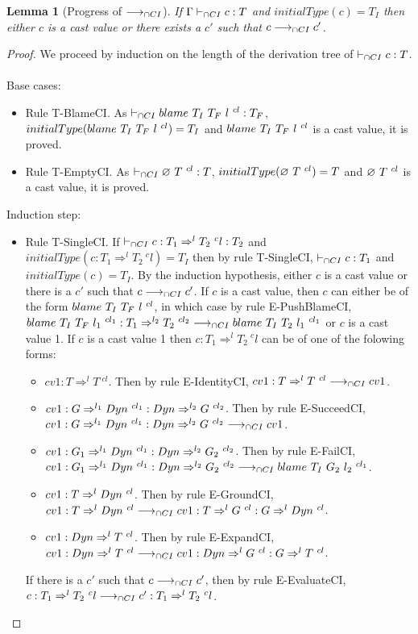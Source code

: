 \documentclass[a4paper]{article}
\newtheorem{lemma}{Lemma}[section]
\begin{document}
\begin{lemma}[Progress of $\longrightarrow_{\cap CI}$]
\label{progressCI}
If $\Gamma \vdash_{\cap CI} c : T$ and $initialType(c) = T_I$ then either $c$ is a cast value or there exists a $c'$ such that $c \longrightarrow_{\cap CI} c'$.
\end{lemma}
\begin{proof}
We proceed by induction on the length of the derivation tree of $\vdash_{\cap CI} c : T$.\\\\
Base cases:
\begin{itemize}
    \item Rule T-BlameCI.
    As $\vdash_{\cap CI} blame\ T_I\ T_F\ l\ ^{cl} : T_F$, $initialType(blame\ T_I\ T_F\ l\ ^{cl}) = T_I$ and $blame\ T_I\ T_F\ l\ ^{cl}$ is a cast value, it is proved.
    \item Rule T-EmptyCI.
    As $\vdash_{\cap CI} \varnothing\ T\ ^{cl} : T$, $initialType(\varnothing\ T\ ^{cl}) = T$ and $\varnothing\ T\ ^{cl}$ is a cast value, it is proved.
\end{itemize}
Induction step:
\begin{itemize}
    \item Rule T-SingleCI.
    If $\vdash_{\cap CI} c : T_1 \Rightarrow^l T_2\ ^cl : T_2$ and $initialType(c : T_1 \Rightarrow^l T_2\ ^cl) = T_I$ then by rule T-SingleCI, $\vdash_{\cap CI} c : T_1$ and $initialType(c) = T_I$.
    By the induction hypothesis, either $c$ is a cast value or there is a $c'$ such that $c \longrightarrow_{\cap CI} c'$.
    If $c$ is a cast value, then $c$ can either be of the form $blame\ T_I\ T_F\ l\ ^{cl}$, in which case by rule E-PushBlameCI, $blame\ T_I\ T_F\ l_1\ ^{cl_1} : T_1 \Rightarrow^{l_2} T_2\ ^{cl_2} \longrightarrow_{\cap CI} blame\ T_I\ T_2\ l_1\ ^{cl_1}$ or $c$ is a cast value 1.
    If $c$ is a cast value 1 then $c : T_1 \Rightarrow^l T_2\ ^cl$ can be of one of the folowing forms:
    \begin{itemize}
        \item $cv1 : T \Rightarrow^l T\ ^{cl}$. Then by rule E-IdentityCI, $cv1 : T \Rightarrow^l T\ ^{cl} \longrightarrow_{\cap CI} cv1$.
        \item $cv1 : G \Rightarrow^{l_1} \Dyn\ ^{cl_1} : \Dyn \Rightarrow^{l_2} G\ ^{cl_2}$. Then by rule E-SucceedCI, $cv1 : G \Rightarrow^{l_1} \Dyn\ ^{cl_1} : \Dyn \Rightarrow^{l_2} G\ ^{cl_2} \cios cv1$.
        \item $cv1 : G_1 \Rightarrow^{l_1} \Dyn\ ^{cl_1} : \Dyn \Rightarrow^{l_2} G_2\ ^{cl_2}$. Then by rule E-FailCI, $cv1 : G_1 \Rightarrow^{l_1} \Dyn\ ^{cl_1} : \Dyn \Rightarrow^{l_2} G_2\ ^{cl_2} \cios \blamecast{T_I}{G_2}{l_2}{cl_1}$.
        \item $cv1 : T \Rightarrow^l \Dyn\ ^{cl}$. Then by rule E-GroundCI, $cv1 : T \Rightarrow^l Dyn\ ^{cl} \longrightarrow_{\cap CI} cv1 : T \Rightarrow^l G\ ^{cl} : G \Rightarrow^l Dyn\ ^{cl}$.
        \item $cv1 : \Dyn \Rightarrow^l T\ ^{cl}$. Then by rule E-ExpandCI, $cv1 : Dyn \Rightarrow^l T\ ^{cl} \longrightarrow_{\cap CI} cv1 : Dyn \Rightarrow^l G\ ^{cl} : G \Rightarrow^l T\ ^{cl}$.
    \end{itemize}
    If there is a $c'$ such that $c \longrightarrow_{\cap CI} c'$, then by rule E-EvaluateCI, $c : T_1 \Rightarrow^l T_2\ ^cl \longrightarrow_{\cap CI} c' : T_1 \Rightarrow^l T_2\ ^cl$.
\end{itemize}
\end{proof}
\end{document}
